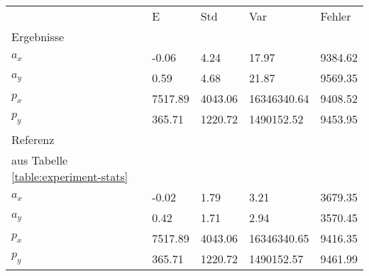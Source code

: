 \begin{tabular}{l|l|l|l|l}

     & E   & Std    & Var    & Fehler \\
\hhline{=|=|=|=|=}

Ergebnisse & & & & \\
$a_x$  &        -0.06 &         4.24 &        17.97 &      9384.62 \\
$a_y$  &         0.59 &         4.68 &        21.87 &      9569.35 \\
$p_x$  &      7517.89 &      4043.06 &  16346340.64 &      9408.52 \\
$p_y$  &       365.71 &      1220.72 &   1490152.52 &      9453.95 \\

\hline
Referenz & & & & \\
aus Tabelle  \ref{table:experiment-stats} & & & & \\
$a_x$  &        -0.02 &         1.79 &         3.21 &      3679.35 \\
$a_y$  &         0.42 &         1.71 &         2.94 &      3570.45 \\
$p_x$  &      7517.89 &      4043.06 &  16346340.65 &      9416.35 \\
$p_y$  &       365.71 &      1220.72 &   1490152.57 &      9461.99 \\
\end{tabular}
